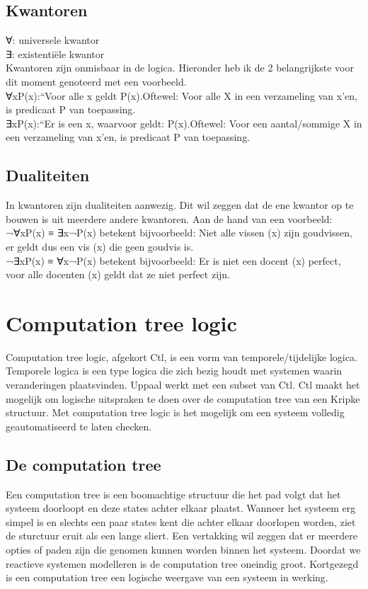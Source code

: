 \documentclass{article}
\begin{document}
\subsection{Kwantoren}
∀: universele kwantor\\
∃: existentiële kwantor\\
Kwantoren zijn onmisbaar in de logica. Hieronder heb ik de 2 belangrijkste voor dit moment genoteerd met een voorbeeld.\\

∀xP(x):“Voor alle x geldt P(x).Oftewel: Voor alle X in een verzameling van x'en, is predicaat P van toepassing.\\

∃xP(x):“Er is een x, waarvoor geldt: P(x).Oftewel: Voor een aantal/sommige X in een verzameling van x'en, is predicaat P van toepassing.

\subsection{Dualiteiten}
In kwantoren zijn dualiteiten aanwezig. Dit wil zeggen dat de ene kwantor op te bouwen is uit meerdere andere kwantoren. Aan de hand van een voorbeeld:\\

¬∀xP(x) ≡ ∃x¬P(x) betekent bijvoorbeeld: Niet alle vissen (x) zijn goudvissen, er geldt dus een vis (x) die geen goudvis is.\\

¬∃xP(x) ≡ ∀x¬P(x) betekent bijvoorbeeld: Er is niet een docent (x) perfect, voor alle docenten (x) geldt dat ze niet perfect zijn.

\section{Computation tree logic}
Computation tree logic, afgekort Ctl, is een vorm van temporele/tijdelijke logica. Temporele logica is een type logica die zich bezig houdt met systemen waarin veranderingen plaatsvinden. Uppaal werkt met een subset van Ctl. Ctl maakt het mogelijk om logische uitspraken te doen over de computation tree van een Kripke structuur. Met computation tree logic is het mogelijk om een systeem volledig geautomatiseerd te laten checken.

\subsection{De computation tree}
Een computation tree is een boomachtige structuur die het pad volgt dat het systeem doorloopt en deze states achter elkaar plaatst. Wanneer het systeem erg simpel is en slechts een paar states kent die achter elkaar doorlopen worden, ziet de sturctuur eruit als een lange sliert. Een vertakking wil zeggen dat er meerdere opties of paden zijn die genomen kunnen worden binnen het systeem. Doordat we reactieve systemen modelleren is de computation tree oneindig groot. Kortgezegd is een computation tree een logische weergave van een systeem in werking.
\end{document}
